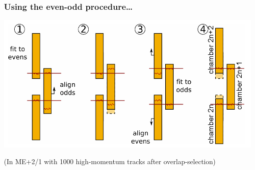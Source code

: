 \documentclass[compress]{beamer}
\begin{document}


\begin{frame}
\frametitle{Using the even-odd procedure\ldots}
\includegraphics[width=\linewidth]{even-odd.png}

\vfill
\small (In ME+2/1 with 1000 high-momentum tracks after overlap-selection)
\end{frame}
\end{document}
